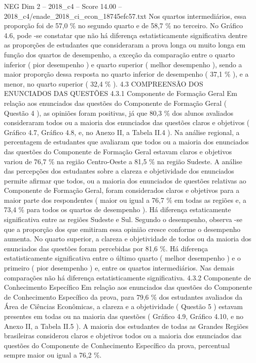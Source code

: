 \begin{textsample}{NEG Dim 2 – 2018\_c4 – Score 14.00 – 2018\_c4/enade\_2018\_ci\_econ\_18745efc57.txt}
Nos quartos intermediários, essa proporção foi de 57,0 \% no segundo quarto e de 58,7 \% no terceiro.
No Gráfico 4.6, pode -se constatar que não há diferença estatisticamente significativa dentre as proporções de estudantes que consideraram a prova longa ou muito longa em função dos quartos de desempenho, a exceção da comparação entre o quarto inferior ( pior desempenho ) e quarto superior ( melhor desempenho ), sendo a maior proporção dessa resposta no quarto inferior de desempenho ( 37,1 \% ), e a menor, no quarto superior ( 32,4 \% ). 4.3 COMPREENSÃO DOS ENUNCIADOS DAS QUESTÕES 4.3.1 Componente de Formação Geral Em relação aos enunciados das questões do Componente de Formação Geral ( Questão 4 ), as opiniões foram positivas, já que 80,3 \% dos alunos avaliados consideraram todos ou a maioria dos enunciados das questões claros e objetivos ( Gráfico 4.7, Gráfico 4.8, e, no Anexo II, a Tabela II.4 ).
Na análise regional, a percentagem de estudantes que avaliaram que todos ou a maioria dos enunciados das questões do Componente de Formação Geral estavam claros e objetivos variou de 76,7 \% na região Centro-Oeste a 81,5 \% na região Sudeste.
A análise das percepções dos estudantes sobre a clareza e objetividade dos enunciados permite afirmar que todos, ou a maioria dos enunciados de questões relativas ao Componente de Formação Geral, foram considerados claros e objetivos para a maior parte dos respondentes ( maior ou igual a 76,7 \% em todas as regiões e, a 73,4 \% para todos os quartos de desempenho ).
Há diferença estaticamente significativa entre as regiões Sudeste e Sul.
Segundo o desempenho, observa -se que a proporção dos que emitiram essa opinião cresce conforme o desempenho aumenta.
No quarto superior, a clareza e objetividade de todos ou da maioria dos enunciados das questões foram percebidas por 81,6 \%.
Há diferença estatisticamente significativa entre o último quarto ( melhor desempenho ) e o primeiro ( pior desempenho ) e, entre os quartos intermediários.
Nas demais comparações não há diferença estatisticamente significativa. 4.3.2 Componente de Conhecimento Específico Em relação aos enunciados das questões do Componente de Conhecimento Específico da prova, para 79,6 \% dos estudantes avaliados da Área de Ciências Econômicas, a clareza e a objetividade ( Questão 5 ) estavam presentes em todas ou na maioria das questões ( Gráfico 4.9, Gráfico 4.10, e no Anexo II, a Tabela II.5 ).
A maioria dos estudantes de todas as Grandes Regiões brasileiras considerou claros e objetivos todos ou a maioria dos enunciados das questões do Componente de Conhecimento Específico da prova, percentual sempre maior ou igual a 76,2 \%.

\end{textsample}

